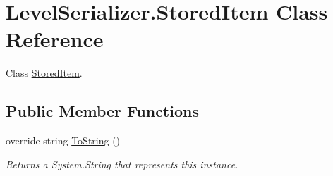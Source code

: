 \hypertarget{class_level_serializer_1_1_stored_item}{}\section{Level\+Serializer.\+Stored\+Item Class Reference}
\label{class_level_serializer_1_1_stored_item}


Class \hyperlink{class_level_serializer_1_1_stored_item}{Stored\+Item}.  


\subsection*{Public Member Functions}
\begin{DoxyCompactItemize}
\item 
override string \hyperlink{class_level_serializer_1_1_stored_item_acf053f24c30be3c60e52ef10581770d0}{To\+String} ()
\begin{DoxyCompactList}\small\item\em Returns a System.\+String that represents this instance. \end{DoxyCompactList}\end{DoxyCompactItemize}
